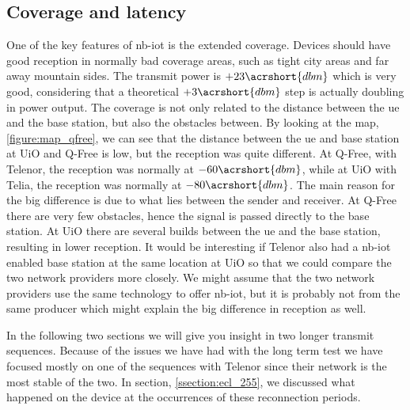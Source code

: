 \documentclass[USenglish]{ifimaster}  %
\begin{document}
\subsection{Coverage and latency}
One of the key features of \acrshort{nb-iot} is the extended coverage. Devices should have good reception in normally bad coverage areas, such as tight city areas and far away mountain sides. The transmit power is ${+23 \acrshort{dbm}}$ which is very good, considering that a theoretical ${+3 \acrshort{dbm}}$ step is actually doubling in power output. The coverage is not only related to the distance between the \acrshort{ue} and the base station, but also the obstacles between. By looking at the map, \vref{figure:map_qfree}, we can see that the distance between the \acrshort{ue} and base station at UiO and Q-Free is low, but the reception was quite different. At Q-Free, with Telenor, the reception was normally at ${-60 \acrshort{dbm}}$, while at UiO with Telia, the reception was normally at ${-80 \acrshort{dbm}}$.
The main reason for the big difference is due to what lies between the sender and receiver. At Q-Free there are very few obstacles, hence the signal is passed directly to the base station. At UiO there are several builds between the \acrshort{ue} and the base station, resulting in lower reception. It would be interesting if Telenor also had a \acrshort{nb-iot} enabled base station at the same location at UiO so that we could compare the two network providers more closely. We might assume that the two network providers use the same technology to offer \acrshort{nb-iot}, but it is probably not from the same producer which might explain the big difference in reception as well.

In the following two sections we will give you insight in two longer transmit sequences. Because of the issues we have had with the long term test we have focused mostly on one of the sequences with Telenor since their network is the most stable of the two. In section, \vref{ssection:ecl_255}, we discussed what happened on the device at the occurrences of these reconnection periods.
\end{document}
